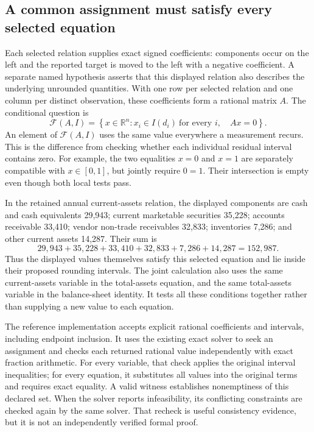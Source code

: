 \subsection{A common assignment must satisfy every selected equation}

Each selected relation supplies exact signed coefficients: components occur
on the left and the reported target is moved to the left with a negative
coefficient. A separate named hypothesis asserts that this displayed
relation also describes the underlying unrounded quantities. With one row
per selected relation and one column per distinct observation, these
coefficients form a rational matrix \(A\). The conditional question is
\begin{equation}
\label{eq:joint-source-feasible-set}
 \mathcal F(A,I)=
 \left\{x\in\mathbb R^n:
 x_i\in I(d_i)\ \text{for every }i,\quad Ax=0\right\}.
\end{equation}
An element of \(\mathcal F(A,I)\) uses the same value everywhere a
measurement recurs. This is the difference from checking whether each
individual residual interval contains zero. For example, the two equalities
\(x=0\) and \(x=1\) are separately compatible with \(x\in[0,1]\),
but jointly require \(0=1\). Their intersection is empty even though both
local tests pass.

In the retained annual current-assets relation, the displayed components are
cash and cash equivalents 29,943; current marketable securities 35,228;
accounts receivable 33,410; vendor non-trade receivables 32,833; inventories
7,286; and other current assets 14,287. Their sum is
\begin{equation}
\label{eq:joint-source-current-assets}
 29{,}943+35{,}228+33{,}410+32{,}833+7{,}286+14{,}287
 =152{,}987.
\end{equation}
Thus the displayed values themselves satisfy this selected equation and lie
inside their proposed rounding intervals. The joint calculation also uses
the same current-assets variable in the total-assets equation, and the same
total-assets variable in the balance-sheet identity. It tests all these
conditions together rather than supplying a new value to each equation.

The reference implementation  accepts
explicit rational coefficients and intervals, including endpoint inclusion.
It uses the existing exact solver to seek an assignment and checks each
returned rational value independently with exact fraction arithmetic.
For every variable, that check applies the original interval inequalities;
for every equation, it substitutes all values into the original terms and
requires exact equality. A valid witness establishes nonemptiness of this
declared set. When the solver reports infeasibility, its conflicting
constraints are checked again by the same solver. That recheck is useful
consistency evidence, but it is not an independently verified formal proof.

